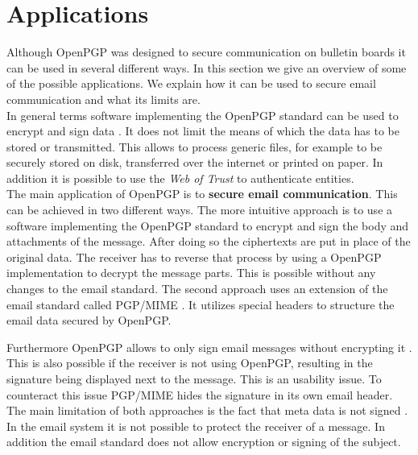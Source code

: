 \section{Applications} \label{section:openpgp:applications}

Although OpenPGP was designed to secure communication on bulletin boards it can be used in several different ways. In this section we give an overview of some of the possible applications. We explain how it can be used to secure email communication and what its limits are.  \\


In general terms software implementing the OpenPGP standard can be used to encrypt and sign data \cite[section 2]{RFC4880}. It does not limit the means of which the data has to be stored or transmitted. This allows to process generic files, for example to be securely stored on disk, transferred over the internet or printed on paper. In addition it is possible to use the \textit{Web of Trust} to authenticate entities. \\  


The main application of OpenPGP is to \textbf{secure email communication}. This can be achieved in two different ways. The more intuitive approach is to use a software implementing the OpenPGP standard to encrypt and sign the body and attachments of the message. After doing so the ciphertexts are put in place of the original data. The receiver has to reverse that process by using a OpenPGP implementation to decrypt the message parts. This is possible without any changes to the email standard. The second approach uses an extension of the email standard called PGP/MIME \citep{RFC3156}. It utilizes special headers to structure the email data secured by OpenPGP.

Furthermore OpenPGP allows to only sign email messages without encrypting it \cite[section 7]{RFC4880}. This is also possible if the receiver is not using OpenPGP, resulting in the signature being displayed next to the message. This is an usability issue. To counteract this issue PGP/MIME hides the signature in its own email header. \\


The main limitation of both approaches is the fact that meta data is not signed \cite{Green2014}. In the email system it is not possible to protect the receiver of a message. In addition the email standard does not allow encryption or signing of the subject. \\

